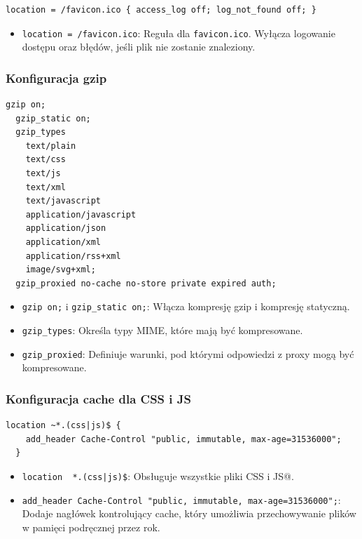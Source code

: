 \begin{lstlisting}[label={lst:n2}]
  location = /favicon.ico { access_log off; log_not_found off; }
\end{lstlisting}
\begin{itemize}
    \item \texttt{location = /favicon.ico}: Reguła dla \texttt{favicon.ico}.
    Wyłącza logowanie dostępu oraz błędów, jeśli plik nie zostanie znaleziony.
\end{itemize}

\subsubsection{Konfiguracja gzip}
\begin{lstlisting}[label={lst:n3}]
  gzip on;
  gzip_static on;
  gzip_types
    text/plain
    text/css
    text/js
    text/xml
    text/javascript
    application/javascript
    application/json
    application/xml
    application/rss+xml
    image/svg+xml;
  gzip_proxied no-cache no-store private expired auth;
\end{lstlisting}
\begin{itemize}
    \item \texttt{gzip on;} i \texttt{gzip\_static on;}: Włącza kompresję gzip i kompresję statyczną.
    \item \texttt{gzip\_types}: Określa typy MIME, które mają być kompresowane.
    \item \texttt{gzip\_proxied}: Definiuje warunki, pod którymi odpowiedzi z proxy mogą być kompresowane.
\end{itemize}

\subsubsection{Konfiguracja cache dla CSS i JS}
\begin{lstlisting}[label={lst:n4}]
  location ~*.(css|js)$ {
    add_header Cache-Control "public, immutable, max-age=31536000";
  }
\end{lstlisting}
\begin{itemize}
    \item \texttt{location ~*.(css|js)\$}: Obsługuje wszystkie pliki CSS i JS@.
    \item \texttt{add\_header Cache-Control "public, immutable, max-age=31536000";}: Dodaje nagłówek kontrolujący cache, który umożliwia przechowywanie plików w pamięci podręcznej przez rok.
\end{itemize}

